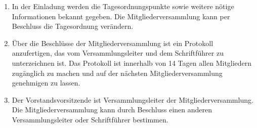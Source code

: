 ﻿\documentclass[10pt,a4paper]{scrartcl}
\begin{document}
\begin{enumerate}
        \item In der Einladung werden die Tagesordnungspunkte sowie weitere nötige Informationen
                bekannt gegeben. Die Mitgliederversammlung kann per Beschluss die Tagesordnung
                ver\-ändern.
        \item Über die Beschlüsse der Mitgliederversammlung ist ein Protokoll anzufertigen,
                das vom Versammlungsleiter und dem Schriftführer zu unterzeichnen ist.
                Das Protokoll ist innerhalb von 14 Tagen allen Mitgliedern zugänglich zu
                machen und auf der nächsten Mitgliederversammlung genehmigen zu lassen.
        \item Der Vorstandsvorsitzende ist Versammlungsleiter der Mitgliederversammlung.
                Die Mitgliederversammlung kann durch Beschluss einen anderen Versammlungsleiter
                oder Schrift\-füh\-rer bestimmen.
\end{enumerate}
%
%
\end{document}
